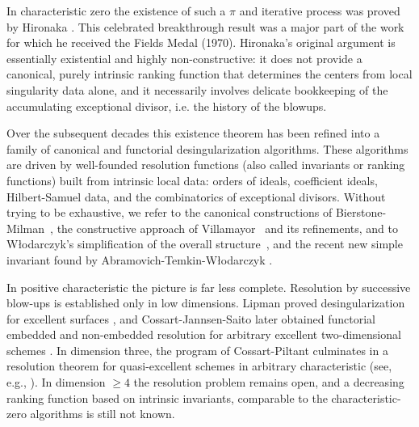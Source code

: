 \documentclass[11pt]{amsart}
\begin{document}
In characteristic zero the existence of such a $\pi$ and iterative process was proved by Hironaka \cite{Hironaka1964}. This celebrated breakthrough result was a major part of the work for which he received the Fields Medal (1970). Hironaka's original argument is essentially existential and highly non-constructive: it does not provide a canonical, purely intrinsic ranking function that determines the centers from local singularity data alone, and it necessarily involves delicate bookkeeping of the accumulating exceptional divisor, i.e. the history of the blowups.

Over the subsequent decades this existence theorem has been refined into a family of canonical and functorial desingularization algorithms.
These algorithms are driven by well-founded resolution functions (also called invariants
or ranking functions) built from intrinsic local data: orders of ideals, coefficient ideals,
Hilbert-Samuel data, and the combinatorics of exceptional divisors.
Without trying to be exhaustive, we refer to the canonical constructions of Bierstone-Milman~\cite{BierstoneMilman1997},
the constructive approach of Villamayor~\cite{Villamayor1989} and its refinements,
and to W\l odarczyk's simplification of the overall structure~\cite{Wlodarczyk2005}, and the recent new simple invariant found by Abramovich-Temkin-W\l odarczyk \cite{AbramovichTemkinWlodarczyk2024,Abramovich2018ICM}.

In positive characteristic the picture is far less complete. Resolution by successive blow-ups is established only in low dimensions. Lipman proved desingularization for excellent surfaces \cite{Lipman1978}, and Cossart-Jannsen-Saito later obtained functorial embedded and non-embedded resolution for arbitrary excellent two-dimensional schemes \cite{CJS2009}. In dimension three, the program of Cossart-Piltant culminates in a resolution theorem for quasi-excellent schemes in arbitrary characteristic (see, e.g., \cite{CossartPiltant2008,CossartPiltant2009,CossartPiltant2014}). In dimension $\ge 4$ the resolution problem remains open, and a decreasing ranking function based on intrinsic invariants, comparable to the characteristic-zero algorithms is still not known.
\end{document}
